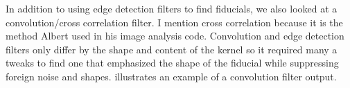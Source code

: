 \documentclass[10pt]{scrartcl}
\begin{document}
In addition to using edge detection filters to find fiducials, we also looked at a convolution/cross correlation filter. I mention cross correlation because it is the method Albert used in his image analysis code. Convolution and edge detection filters only differ by the shape and content of the kernel so it required many a tweaks to find one that emphasized the shape of the fiducial while suppressing foreign noise and shapes.  illustrates an example of a convolution filter output.


\begin{figure}[!ht]
\end{figure}
\end{document}
